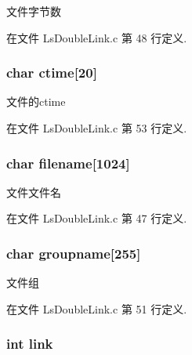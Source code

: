 文件字节数 



在文件 Ls\-Double\-Link.\-c 第 48 行定义.

\hypertarget{struct_file_info_a607e3c2e52f5b3b02c357e8f42158f1a}{
\subsubsection[{ctime}]{\setlength{\rightskip}{0pt plus 5cm}char ctime\mbox{[}20\mbox{]}}}\label{struct_file_info_a607e3c2e52f5b3b02c357e8f42158f1a}


文件的ctime 



在文件 Ls\-Double\-Link.\-c 第 53 行定义.

\hypertarget{struct_file_info_a5482b27881397d5b87f54feab7471580}{
\subsubsection[{filename}]{\setlength{\rightskip}{0pt plus 5cm}char filename\mbox{[}1024\mbox{]}}}\label{struct_file_info_a5482b27881397d5b87f54feab7471580}


文件文件名 



在文件 Ls\-Double\-Link.\-c 第 47 行定义.

\hypertarget{struct_file_info_a9f6545b7fd455eaac34ee2bc61d2a172}{
\subsubsection[{groupname}]{\setlength{\rightskip}{0pt plus 5cm}char groupname\mbox{[}255\mbox{]}}}\label{struct_file_info_a9f6545b7fd455eaac34ee2bc61d2a172}


文件组 



在文件 Ls\-Double\-Link.\-c 第 51 行定义.

\hypertarget{struct_file_info_af203a1810ce3b44e2b2219c63e0ceff9}{
\subsubsection[{link}]{\setlength{\rightskip}{0pt plus 5cm}int link}}\label{struct_file_info_af203a1810ce3b44e2b2219c63e0ceff9}


